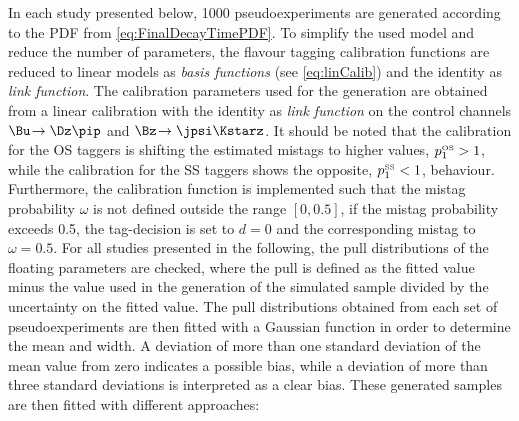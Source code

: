 In each study presented below, \num{1000} pseudoexperiments are generated according to the PDF from \cref{eq:FinalDecayTimePDF}.
To simplify the used model and reduce the number of parameters, the flavour tagging calibration functions are reduced to linear models as \emph{basis functions} (see \cref{eq:linCalib}) and the identity as \emph{link function}.
The calibration parameters used for the generation are obtained from a linear calibration with the identity as \emph{link function} on the control channels $\Bu\!\to\Dz\pip$ and $\Bz\!\to\jpsi\Kstarz$.
It should be noted that the calibration for the OS taggers is shifting the estimated mistags to higher values, \ie $p_1^{\text{\tiny OS}}>1$, while the calibration for the SS taggers shows the opposite, \ie $p_1^{\text{\tiny SS}}<1$, behaviour.
Furthermore, the calibration function is implemented such that the mistag probability $\omega$ is not defined outside the range $[0, 0.5]$, \ie if the mistag probability exceeds \num{0.5}, the tag-decision is set to $d=0$ and the corresponding mistag to $\omega=0.5$.
For all studies presented in the following, the pull distributions of the floating parameters are checked, where the pull is defined as the fitted value minus the value used in the generation of the simulated sample divided by the uncertainty on the fitted value.
The pull distributions obtained from each set of pseudoexperiments are then fitted with a Gaussian function in order to determine the mean and width.
A deviation of more than one standard deviation of the mean value from zero indicates a possible bias, while a deviation of more than three standard deviations is interpreted as a clear bias.
These generated samples are then fitted with different approaches:
